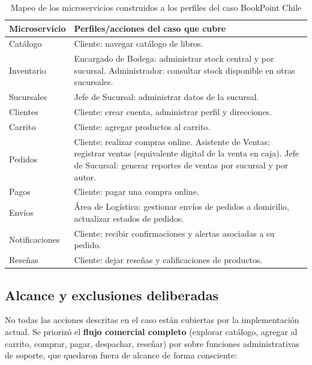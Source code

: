 \begin{table}[h]
\centering
\small
\begin{tabularx}{\textwidth}{lX}
\toprule
\textbf{Microservicio} & \textbf{Perfiles/acciones del caso que cubre} \\
\midrule
Catálogo & Cliente: navegar catálogo de libros. \\
Inventario & Encargado de Bodega: administrar stock central y por sucursal.
Administrador: consultar stock disponible en otras sucursales. \\
Sucursales & Jefe de Sucursal: administrar datos de la sucursal. \\
Clientes & Cliente: crear cuenta, administrar perfil y direcciones. \\
Carrito & Cliente: agregar productos al carrito. \\
Pedidos & Cliente: realizar compras online. Asistente de Ventas: registrar ventas
(equivalente digital de la venta en caja). Jefe de Sucursal: generar reportes de
ventas por sucursal y por autor. \\
Pagos & Cliente: pagar una compra online. \\
Envíos & Área de Logística: gestionar envíos de pedidos a domicilio, actualizar
estados de pedidos. \\
Notificaciones & Cliente: recibir confirmaciones y alertas asociadas a su pedido. \\
Reseñas & Cliente: dejar reseñas y calificaciones de productos. \\
\bottomrule
\end{tabularx}
\caption{Mapeo de los microservicios construidos a los perfiles del caso BookPoint Chile}
\label{tab:mapeo-perfiles}
\end{table}

\subsection{Alcance y exclusiones deliberadas}

No todas las acciones descritas en el caso están cubiertas por la implementación
actual. Se priorizó el \textbf{flujo comercial completo} (explorar catálogo, agregar al
carrito, comprar, pagar, despachar, reseñar) por sobre funciones administrativas de
soporte, que quedaron fuera de alcance de forma consciente:

